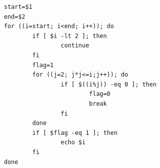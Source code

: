 \begin{verbatim}
start=$1
end=$2
for ((i=start; i<end; i++)); do
        if [ $i -lt 2 ]; then
                continue
        fi
        flag=1
        for ((j=2; j*j<=i;j++)); do
                if [ $((i%j)) -eq 0 ]; then
                        flag=0
                        break
                fi
        done
        if [ $flag -eq 1 ]; then
                echo $i
        fi
done
\end{verbatim}